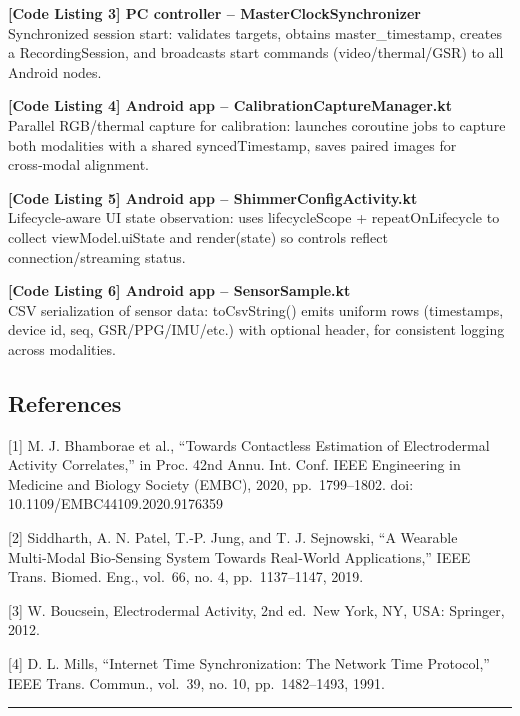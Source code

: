 \documentclass[12pt,a4paper]{article}
\begin{document}
\textbf{{[}Code Listing 3{]} PC controller -- MasterClockSynchronizer}\\
Synchronized session start: validates targets, obtains master\_timestamp, creates a RecordingSession, and broadcasts start commands (video/thermal/GSR) to all Android nodes.

\textbf{{[}Code Listing 4{]} Android app -- CalibrationCaptureManager.kt}\\
Parallel RGB/thermal capture for calibration: launches coroutine jobs to capture both modalities with a shared syncedTimestamp, saves paired images for cross‑modal alignment.

\textbf{{[}Code Listing 5{]} Android app -- ShimmerConfigActivity.kt}\\
Lifecycle‑aware UI state observation: uses lifecycleScope + repeatOnLifecycle to collect viewModel.uiState and render(state) so controls reflect connection/streaming status.

\textbf{{[}Code Listing 6{]} Android app -- SensorSample.kt}\\
CSV serialization of sensor data: toCsvString() emits uniform rows (timestamps, device id, seq, GSR/PPG/IMU/etc.) with optional header, for consistent logging across modalities.

\subsection{References}\label{references-2}

{[}1{]} M. J. Bhamborae et al., ``Towards Contactless Estimation of Electrodermal Activity Correlates,'' in Proc. 42nd Annu. Int. Conf. IEEE Engineering in Medicine and Biology Society (EMBC), 2020, pp.~1799--1802. doi: 10.1109/EMBC44109.2020.9176359

{[}2{]} Siddharth, A. N. Patel, T.-P. Jung, and T. J. Sejnowski, ``A Wearable Multi‑Modal Bio‑Sensing System Towards Real‑World Applications,'' IEEE Trans. Biomed. Eng., vol.~66, no. 4, pp.~1137--1147, 2019.

{[}3{]} W. Boucsein, Electrodermal Activity, 2nd ed.~New York, NY, USA: Springer, 2012.

{[}4{]} D. L. Mills, ``Internet Time Synchronization: The Network Time Protocol,'' IEEE Trans. Commun., vol.~39, no. 10, pp.~1482--1493, 1991.

\begin{center}\rule{0.5\linewidth}{0.5pt}\end{center}

\newpage
\end{document}
